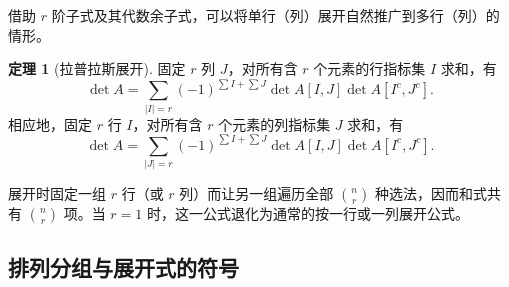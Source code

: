 \documentclass[UTF8, fontset=fandol, a4paper, 12pt]{ctexart}
\theoremstyle{definition}
\newtheorem{theorem}{定理}[section]
\begin{document}
借助 $r$ 阶子式及其代数余子式，可以将单行（列）展开自然推广到多行（列）的情形。

\begin{theorem}[拉普拉斯展开]
固定 $r$ 列 $J$，对所有含 $r$ 个元素的行指标集 $I$ 求和，有
\[
 \boxed{\det A=\sum_{|I|=r}(-1)^{\sum I+\sum J}
       \det A[I,J]\det A[I^c,J^c].}
\]
相应地，固定 $r$ 行 $I$，对所有含 $r$ 个元素的列指标集 $J$ 求和，有
\[
 \det A=\sum_{|J|=r}(-1)^{\sum I+\sum J}
       \det A[I,J]\det A[I^c,J^c].
\]
\end{theorem}

展开时固定一组 $r$ 行（或 $r$ 列）而让另一组遍历全部 $\binom nr$ 种选法，因而和式共有 $\binom nr$ 项。当 $r=1$ 时，这一公式退化为通常的按一行或一列展开公式。

\subsection{排列分组与展开式的符号}
\end{document}

